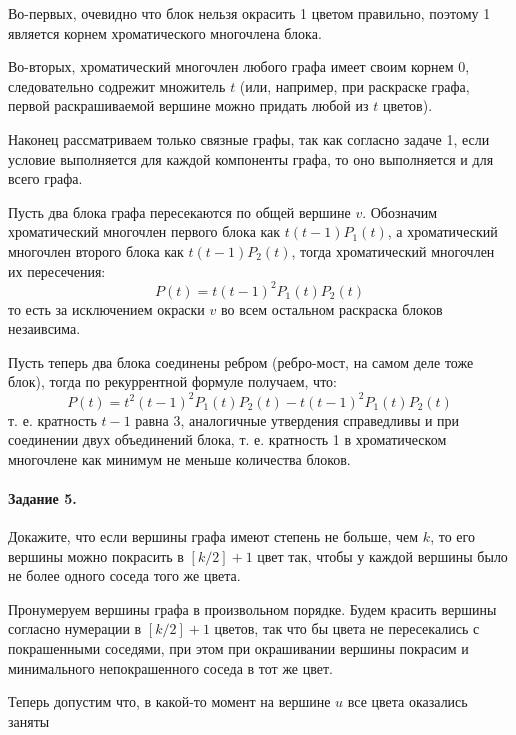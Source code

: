 \documentclass[a4paper,12pt]{article}
\begin{document}
\begin{Solution}
Во-первых, очевидно что блок нельзя окрасить 1 цветом правильно, поэтому 1 является корнем хроматического многочлена блока.

Во-вторых, хроматический многочлен любого графа имеет своим корнем 0, следовательно содрежит множитель $t$ (или, например, при раскраске графа, первой раскрашиваемой вершине можно придать любой из $t$ цветов).

Наконец рассматриваем только связные графы, так как согласно задаче 1, если условие выполняется для каждой компоненты графа, то оно выполняется и для всего графа.

Пусть два блока графа пересекаются по общей вершине $v$. Обозначим хроматический многочлен первого блока как $t \left(t-1\right) P_1\left(t\right)$, а хроматический многочлен второго блока как $t \left(t-1\right) P_2\left(t\right)$, тогда хроматический многочлен их пересечения:
\[
	P\left(t\right) = t \left(t-1\right)^2 P_1\left(t\right) P_2\left(t\right)
\]
то есть за исключением окраски $v$ во всем остальном раскраска блоков незаивсима.

Пусть теперь два блока соединены ребром (ребро-мост, на самом деле тоже блок), тогда по рекуррентной формуле получаем, что:
\[
	P\left(t\right) = t^2\left(t-1\right)^2P_1\left(t\right) P_2\left(t\right) - t \left(t-1\right)^2 P_1\left(t\right) P_2\left(t\right)
\]
т. е. кратность $t-1$ равна 3, аналогичные утвердения справедливы и при соединении двух объединений блока, т. е. кратность 1 в хроматическом многочлене как минимум не меньше количества блоков.
\end{Solution}

\paragraph{Задание 5.} Докажите, что если вершины графа имеют степень не больше, чем $k$, то его вершины можно покрасить в $\left[k/2\right]+1$ цвет так, чтобы у каждой вершины было не более одного соседа того же цвета.

\begin{Solution}
Пронумеруем вершины графа в произвольном порядке. Будем красить вершины согласно нумерации в $\left[k/2\right] + 1$ цветов, так что бы цвета не пересекались с покрашенными соседями, при этом при окрашивании вершины покрасим и минимального непокрашенного соседа в тот же цвет.

Теперь допустим что, в какой-то момент на вершине $u$ все цвета оказались заняты
\end{Solution}
\end{document}
